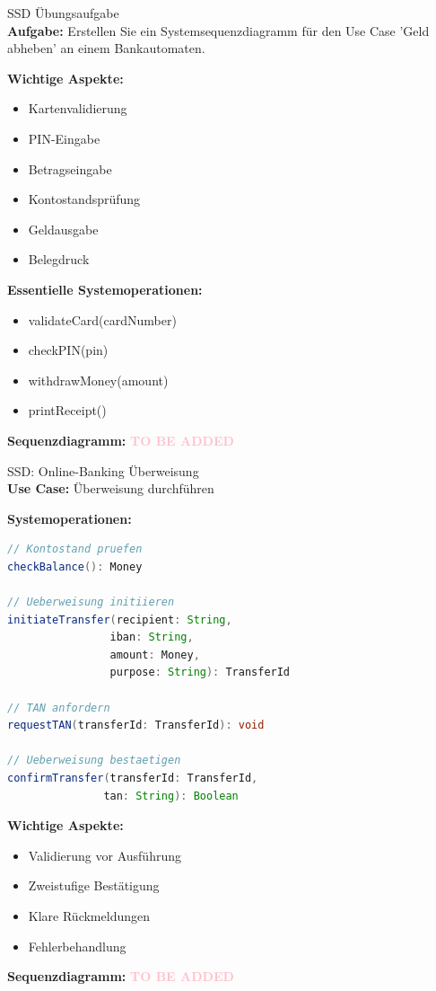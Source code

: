 \begin{example2}{SSD Übungsaufgabe}\\
\textbf{Aufgabe:} Erstellen Sie ein Systemsequenzdiagramm für den Use Case 'Geld abheben' an einem Bankautomaten.

\textbf{Wichtige Aspekte:}
\begin{itemize}
    \item Kartenvalidierung
    \item PIN-Eingabe
    \item Betragseingabe
    \item Kontostandsprüfung
    \item Geldausgabe
    \item Belegdruck
\end{itemize}

\textbf{Essentielle Systemoperationen:}
\begin{itemize}
    \item validateCard(cardNumber)
    \item checkPIN(pin)
    \item withdrawMoney(amount)
    \item printReceipt()
\end{itemize}

\textbf{Sequenzdiagramm:} %
\textcolor{pink}{\textbf{TO BE ADDED}}
\end{example2}


\begin{example2}{SSD: Online-Banking Überweisung}\\
\textbf{Use Case:} Überweisung durchführen

\textbf{Systemoperationen:}
\begin{lstlisting}[language=Java, style=base]
// Kontostand pruefen
checkBalance(): Money

// Ueberweisung initiieren
initiateTransfer(recipient: String, 
                iban: String, 
                amount: Money, 
                purpose: String): TransferId

// TAN anfordern
requestTAN(transferId: TransferId): void

// Ueberweisung bestaetigen
confirmTransfer(transferId: TransferId, 
               tan: String): Boolean
\end{lstlisting}

\textbf{Wichtige Aspekte:}
\begin{itemize}
    \item Validierung vor Ausführung
    \item Zweistufige Bestätigung
    \item Klare Rückmeldungen
    \item Fehlerbehandlung
\end{itemize}

\textbf{Sequenzdiagramm:} %
\textcolor{pink}{\textbf{TO BE ADDED}}
\end{example2}


